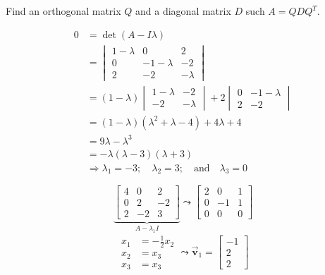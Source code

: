 \documentclass[letter,11pt]{article}
\theoremstyle{definition}
\begin{document}
Find an orthogonal matrix $Q$ and a diagonal matrix $D$ such $A=Q D Q^{T}$.

\begin{tcolorbox}[boxrule=1mm, width=(\linewidth),before=\hfill,after=\hfill,adjusted title={Problem 3 Solutions}]
    \begin{align*}
       0 &= \operatorname{det} \left(A - I\lambda\right)\\
        &= \begin{vmatrix}1 - \lambda & 0 & 2 \\ 0 & -1- \lambda & -2 \\ 2 & -2 & - \lambda\end{vmatrix}\\
        &= (1-\lambda)\begin{vmatrix}1 - \lambda & -2\\ -2 & -\lambda\end {vmatrix} + 2\begin{vmatrix} 0 & -1-\lambda\\ 2 & -2\end{vmatrix}\\
        & = (1-\lambda)\left(\lambda^2+\lambda-4\right)+ 4\lambda +4\\
        & = 9\lambda - \lambda^3\\
        & = -\lambda\left(\lambda-3\right)\left(\lambda+3\right)\\
        & \Rightarrow \lambda_{1}= -3; \quad \lambda_{2} = 3; \quad \text{and} \quad \lambda_{3}=0
\end{align*}
        \begin{minipage}{0.333\textwidth}
            $$\underbrace{\begin{bmatrix} 4 & 0 & 2 \\ 0 & 2 & -2 \\ 2 & -2 & 3 \end{bmatrix}}_{A-\lambda_{1}I}\leadsto \begin{bmatrix} 2 & 0 & 1 \\ 0 & -1 & 1 \\ 0 & 0 & 0\end{bmatrix}$$
            $$\begin{aligned}
                 x_{1} &= -\frac{1}{2}x_{2}\\
                    x_{2} &= x_{3}\\
                    x_{3}&=x_{3}
        \end{aligned}\leadsto \vec{\boldsymbol{v}}_1 = \begin{bmatrix}-1\\2\\2\end{bmatrix}$$

\end{minipage}
\end{tcolorbox}
\end{document}
